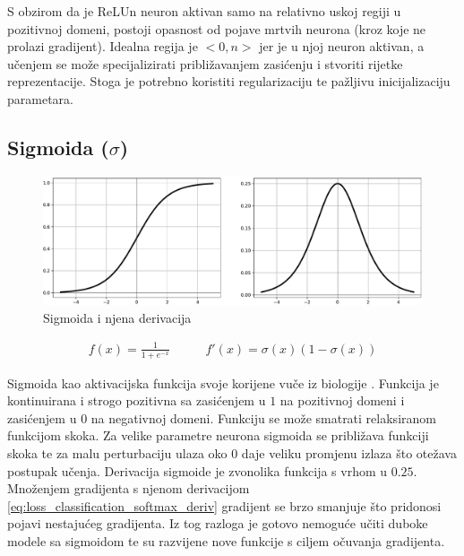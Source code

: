 \documentclass[times, utf8, numeric, diplomski]{fer}
\begin{document}
S obzirom da je ReLUn neuron aktivan samo na relativno uskoj regiji u pozitivnoj domeni, postoji opasnost od pojave mrtvih neurona (kroz koje ne prolazi gradijent). Idealna regija je $<0,n>$ jer  je u njoj neuron aktivan, a učenjem se može specijalizirati približavanjem zasićenju i stvoriti rijetke reprezentacije. Stoga je potrebno koristiti regularizaciju te pažljivu inicijalizaciju parametara.

\subsection{Sigmoida ($\sigma $)}

\begin{figure}[H]
\includegraphics[width=\textwidth]{func_Sigmoid.pdf}
\centering
\caption{Sigmoida i njena derivacija}
\label{fig:sigmoid}
\end{figure}

\begin{equation}
\label{eq:sigmoid}
\begin{split}
f(x) = \frac{1}{1+e^{-x}}
\end{split}
\qquad
\begin{split}
f'(x) = \sigma(x)(1-\sigma(x))
\end{split}
\end{equation}

Sigmoida kao aktivacijska funkcija svoje korijene vuče iz biologije \citep[str.~16]{neuroscience}. Funkcija je kontinuirana i strogo pozitivna sa zasićenjem u $1$ na pozitivnoj domeni i zasićenjem u $0$ na negativnoj domeni. Funkciju se može smatrati relaksiranom funkcijom skoka. Za velike parametre neurona sigmoida se približava funkciji skoka te za malu perturbaciju ulaza oko 0 daje veliku promjenu izlaza što otežava postupak učenja. Derivacija sigmoide je zvonolika funkcija s vrhom u $0.25$. Množenjem gradijenta s njenom derivacijom \eqref{eq:loss_classification_softmax_deriv} gradijent se brzo smanjuje što pridonosi pojavi nestajućeg gradijenta. Iz tog razloga je gotovo nemoguće učiti duboke modele sa sigmoidom te su razvijene nove funkcije s ciljem očuvanja gradijenta.
\end{document}
